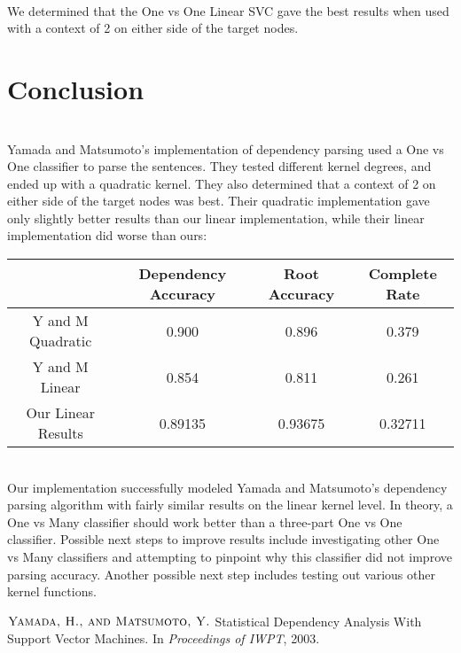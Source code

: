 \documentclass[12pt,fleqn]{amsart}
\begin{document}
\noindent \\
We determined that the One vs One Linear SVC gave the best results when used with a context of 2 on either side of the target nodes. 

\section{Conclusion}

\noindent \\
Yamada and Matsumoto's implementation of dependency parsing used a One vs One classifier to parse the sentences. They tested different kernel degrees, and ended up with a quadratic kernel. They also determined that a context of 2 on either side of the target nodes was best. Their quadratic implementation gave only slightly better results than our linear implementation, while their linear implementation did worse than ours:       \\
 \begin{tabular}{|c|c|c|c|}
            \hline & Dependency Accuracy & Root Accuracy & Complete Rate \\ \hline
            Y and M Quadratic & 0.900 & 0.896 & 0.379 \\ \hline
            Y and M Linear & 0.854 & 0.811 & 0.261 \\ \hline
            Our Linear Results & 0.89135 & 0.93675 & 0.32711 \\ \hline

        \end{tabular}\\

Our implementation successfully modeled Yamada and Matsumoto's dependency parsing algorithm with fairly similar results on the linear kernel level. In theory, a One vs Many classifier should work better than a three-part One vs One classifier. Possible next steps to improve results include investigating other One vs Many classifiers and attempting to pinpoint why this classifier did not improve parsing accuracy. Another possible next step includes testing out various other kernel functions. \\
        
        

\begin{thebibliography}{1}
$\textsc{Yamada, H., and Matsumoto, Y.}$ Statistical Dependency Analysis With Support Vector Machines. In \emph{Proceedings of IWPT}, 2003.
\end{thebibliography}
\end{document}
